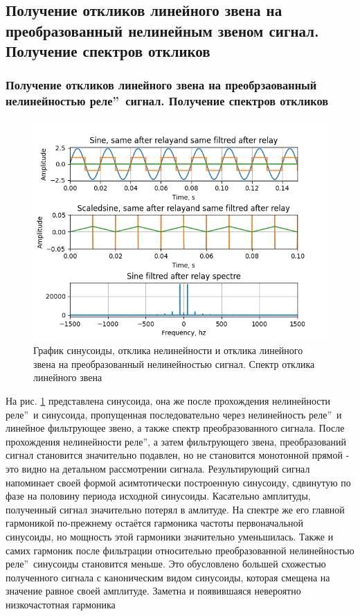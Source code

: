 \subsection{Получение откликов линейного звена на преобразованный
нелинейным звеном сигнал. Получение спектров откликов}

\subsubsection{Получение откликов линейного звена на преобрзаованный
нелинейностью  реле\textquotedblright\ сигнал.
Получение спектров откликов}

\begin{figure}[H]
	\centering
	\includegraphics[width=0.95\linewidth]{body/images/sine-after-filtred-relay-and-its-spectre.png}
	\caption{График синусоиды, отклика нелинейности и отклика линейного звена на преобразованный
	нелинейностью сигнал. Спектр отклика линейного звена}
	\label{fig:22}
\end{figure}

На рис. \ref{fig:22} представлена синусоида, она же после прохождения
нелинейности  реле\textquotedblright\ и синусоида,
пропущенная последовательно через нелинейность  реле\textquotedblright\
и линейное фильтрующее звено, а также спектр преобразованного сигнала.
После прохождения нелинейности \textquotedblleftИдеальное реле\textquotedblright, а
затем фильтрующего звена, преобразований сигнал становится значительно подавлен,
но не становится монотонной прямой - это видно на детальном рассмотрении сигнала.
Результирующий сигнал напоминает своей формой асимтотически построенную синусоиду,
сдвинутую по фазе на половину периода исходной синусоиды. Касательно амплитуды,
полученный сигнал значительно потерял в амлитуде. На спектре же его главной
гармоникой по-прежнему остаётся гармоника частоты первоначальной синусоиды,
но мощность этой гармоники значительно уменьшилась. Также и самих гармоник
после фильтрации относительно преобразованной нелинейностью
 реле\textquotedblright\ синусоиды становится
меньше. Это обусловлено большей схожестью полученного сигнала с каноническим
видом синусоиды, которая смещена на значение равное своей амплитуде.
Заметна и появившаяся невероятно низкочастотная гармоника

